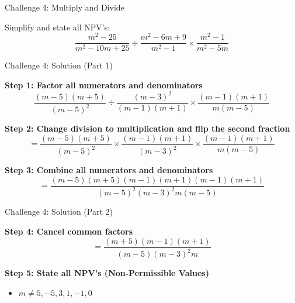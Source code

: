 \documentclass[aspectratio=169]{beamer}
\begin{document}
\begin{frame}{Challenge 4: Multiply and Divide}
\begin{tcolorbox}[colback=lightgray,colframe=primary,title=Challenge 4]
\footnotesize
Simplify and state all NPV's:
\[
\frac{m^2-25}{m^2-10m+25} \div \frac{m^2-6m+9}{m^2-1} \times \frac{m^2-1}{m^2-5m}
\]
\end{tcolorbox}
\end{frame}

\begin{frame}{Challenge 4: Solution (Part 1)}
\begin{tcolorbox}[colback=lightgray,colframe=accent,title=Step-by-Step Solution (Part 1)]
\footnotesize
\textbf{Step 1: Factor all numerators and denominators}
\[
\frac{(m-5)(m+5)}{(m-5)^2} \div \frac{(m-3)^2}{(m-1)(m+1)} \times \frac{(m-1)(m+1)}{m(m-5)}
\]

\textbf{Step 2: Change division to multiplication and flip the second fraction}
\[
= \frac{(m-5)(m+5)}{(m-5)^2} \times \frac{(m-1)(m+1)}{(m-3)^2} \times \frac{(m-1)(m+1)}{m(m-5)}
\]

\textbf{Step 3: Combine all numerators and denominators}
\[
= \frac{(m-5)(m+5)(m-1)(m+1)(m-1)(m+1)}{(m-5)^2(m-3)^2 m(m-5)}
\]
\end{tcolorbox}
\end{frame}

\begin{frame}{Challenge 4: Solution (Part 2)}
\begin{tcolorbox}[colback=lightgray,colframe=accent,title=Step-by-Step Solution (Part 2)]
\footnotesize
\textbf{Step 4: Cancel common factors}
\[
= \frac{(m+5)(m-1)(m+1)}{(m-5)(m-3)^2 m}
\]

\textbf{Step 5: State all NPV's (Non-Permissible Values)}
\begin{itemize}
  \item $m \neq 5, -5, 3, 1, -1, 0$
\end{itemize}
\end{tcolorbox}
\end{frame}
\end{document}
